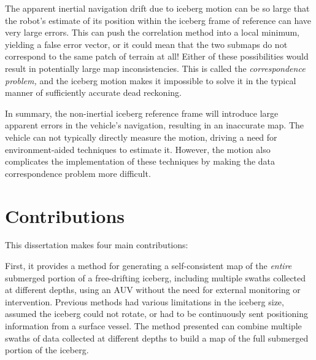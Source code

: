 The apparent inertial navigation drift due to iceberg motion can be so large that the robot's estimate of its position within the iceberg frame of reference can have very large errors. This can push the correlation method into a local minimum, yielding a false error vector, or it could mean that the two submaps do not correspond to the same patch of terrain at all! Either of these possibilities would result in potentially large map inconsistencies. This is called the \emph{correspondence problem,} and the iceberg motion makes it impossible to solve it in the typical manner of sufficiently accurate dead reckoning.   %



In summary, the non-inertial iceberg reference frame will introduce large apparent errors in the vehicle's navigation, resulting in an inaccurate map. The vehicle can not typically directly measure the motion, driving a need for environment-aided techniques to estimate it. However, the motion also complicates the implementation of these techniques by making the data correspondence problem more difficult. 

\section{Contributions}

This dissertation makes four main contributions:

First, it provides a method for generating a self-consistent map of the \emph{entire} submerged portion of a free-drifting iceberg, including multiple swaths collected at different depths, using an AUV without the need for external monitoring or intervention. Previous methods had various limitations in the iceberg size, assumed the iceberg could not rotate, or had to be continuously sent positioning information from a surface vessel. The method presented can combine multiple swaths of data collected at different depths to build a map of the full submerged portion of the iceberg. 


